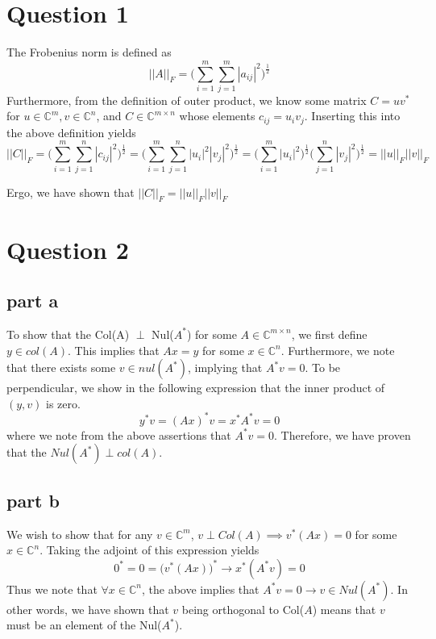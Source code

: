 \documentclass[a4paper,12pt]{article}
\begin{document}
\section{Question 1}
The Frobenius norm is defined as
\begin{equation}
|| A||_F = \bigg( \sum_{i=1}^m \sum_{j=1}^m |a_{ij}|^2\bigg)^{\frac{1}{2}}
\end{equation}
Furthermore, from the definition of outer product, we know some matrix $C=uv^*$ for $u\in \mathbb{C}^m, v \in \mathbb{C}^n$, and $C\in \mathbb{C}^{m\times n}$ whose  elements $c_{ij} = u_iv_j$. Inserting this into the above definition yields
\begin{equation}
||C||_F =\bigg(\sum_{i=1}^m \sum_{j=1}^n |c_{ij}|^2 \bigg)^{\frac{1}{2}}=\bigg(\sum_{i=1}^m \sum_{j=1}^n |u_i |^2 |v_j|^2 \bigg)^{\frac{1}{2}}=\bigg(\sum_{i=1}^m |u_i|^2\bigg)^{\frac{1}{2}} \bigg(\sum_{j=1}^n |v_j|^2\bigg)^{\frac{1}{2}} =||u||_F ||v||_F
\end{equation}


Ergo, we have shown that $||C||_F  =||u||_F ||v||_F$



\section{Question 2 }
\subsection{part a}
To show that the Col(A) $\perp$ Nul($A^*$) for some $A \in \mathbb{C}^{m\times n}$, we first define $y\in col(A)$. This implies that $Ax=y$ for some $x\in \mathbb{C}^n$. Furthermore, we note that there exists some $v\in nul(A^*)$, implying that $A^*v = 0$. To be perpendicular, we show in the following expression that the inner product of $(y,v)$ is zero. 
\begin{equation}
y^*v = (Ax)^*v = x^* A^* v = 0
\end{equation}
where we note from the above assertions that $A^* v = 0$. Therefore, we have proven that the $Nul(A^*) \perp col(A)$.


\subsection{part b}
We wish to show that for any $v\in \mathbb{C}^m$,
$v \perp Col(A) \implies v^*(Ax)=0$ for some $x\in \mathbb{C}^n$. Taking the adjoint of this expression yields
\begin{equation}
0^*=0=\bigg( v^*(Ax)\bigg)^* \rightarrow x^*(A^*v)=0 
\end{equation}
Thus we note that $\forall x \in \mathbb{C}^n$, the above implies that $A^*v=0 \rightarrow v\in Nul(A^*)$. In other words, we have shown that $v$ being orthogonal to Col($A$) means that $v$ must be an element of the Nul($A^*$).
\end{document}
